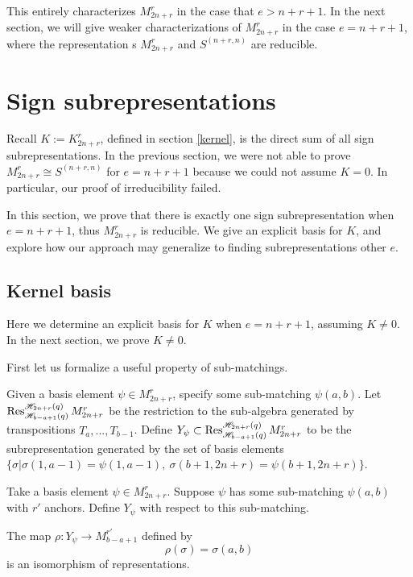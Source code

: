 \documentclass{amsart}
\begin{document}
  This entirely characterizes $M_{2n + r}^r$ in the case that $e > n + r + 1$.
  In the next section, we will give weaker characterizations of $M_{2n + r}^r$ in the case $e = n + r + 1$, where the representation s $M_{2n + r}^r$ and $S^{(n+r,n)}$ are reducible.

 \section{Sign subrepresentations}\label{Sign section}
 Recall $K:=K^r_{2n+r}$, defined in section \ref{kernel}, is the direct sum of all sign subrepresentations. In the previous section, we were not able to prove $M_{2n+r}^r\cong S^{(n+r,n)}$ for $e=n+r+1$ because we could not assume $K=0$. In particular, our proof of irreducibility failed.
 
 In this section, we prove that there is exactly one sign subrepresentation when $e=n+r+1$, thus $M_{2n+r}^r$ is reducible. We give an explicit basis for $K$, and explore how our approach may generalize to finding subrepresentations other $e$.
 
 
 \subsection{Kernel basis}
 
 
 Here we determine an explicit basis for $K$ when $e=n+r+1$, assuming $K\not=0$. In the next section, we prove $K\not=0$.
 
 First let us formalize a useful property of sub-matchings.
 
 \begin{definition}
 	Given a basis element $\psi\in M_{2n+r}^r$, specify some sub-matching $\psi(a,b)$. Let $\operatorname{Res}_{\mathscr{H}_{b-a+1}(q)}^{\mathscr{H}_{2n+r}(q)}M_{2n+r}^r$ be the restriction to the sub-algebra generated by transpositions $T_a,...,T_{b-1}$. Define $Y_\psi\subset\operatorname{Res}_{\mathscr{H}_{b-a+1}(q)}^{\mathscr{H}_{2n+r}(q)}M_{2n+r}^r$ to be the subrepresentation generated by the set of basis elements $\{\sigma| \sigma(1,a-1)=\psi(1,a-1),\ \sigma(b+1,2n+r)=\psi(b+1,2n+r)\}$.
 \end{definition}
 
 \begin{lemma}
 	Take a basis element $\psi\in M_{2n+r}^r$. Suppose $\psi$ has some sub-matching $\psi(a,b)$ with $r'$ anchors. Define $Y_\psi$ with respect to this sub-matching.
 	
 	The map $\rho:Y_\psi\rightarrow M_{b-a+1}^{r'}$ defined by $$\rho(\sigma)=\sigma(a,b)$$ is an isomorphism of representations.
 	
 	\label{sub-matching isomorphism}
 \end{lemma}
 
\end{document}
